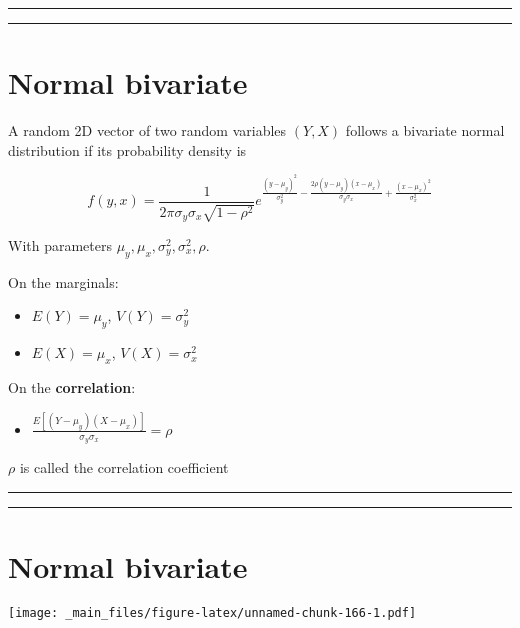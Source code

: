 \documentclass[
]{book}
\providecommand{\tightlist}{%
  \setlength{\itemsep}{0pt}\setlength{\parskip}{0pt}}
\begin{document}
\begin{center}\rule{0.5\linewidth}{0.5pt}\end{center}

\begin{center}\rule{0.5\linewidth}{0.5pt}\end{center}

\hypertarget{normal-bivariate}{%
\section{Normal bivariate}\label{normal-bivariate}}

A random 2D vector of two random variables \((Y, X)\) follows a bivariate normal distribution if its probability density is

\[f(y,x)=\frac{1}{2\pi \sigma_y\sigma_x \sqrt{1-\rho^2}}e^{\frac{(y-\mu_y)^2}{\sigma_y^2}-\frac{2\rho(y-\mu_y)(x-\mu_x)}{\sigma_y\sigma_x}+\frac{(x-\mu_x)^2}{\sigma_x^2}}\]

With parameters \(\mu_y, \mu_x, \sigma^2_y, \sigma_x^2, \rho\).

On the marginals:

\begin{itemize}
\tightlist
\item
  \(E(Y)=\mu_y\), \(V(Y)=\sigma^2_y\)
\item
  \(E(X)=\mu_x\), \(V(X)=\sigma^2_x\)
\end{itemize}

On the \textbf{correlation}:

\begin{itemize}
\tightlist
\item
  \(\frac{E[(Y-\mu_y)(X-\mu_x)]}{\sigma_y\sigma_x}=\rho\)
\end{itemize}

\(\rho\) is called the correlation coefficient

\begin{center}\rule{0.5\linewidth}{0.5pt}\end{center}

\begin{center}\rule{0.5\linewidth}{0.5pt}\end{center}

\hypertarget{normal-bivariate-1}{%
\section{Normal bivariate}\label{normal-bivariate-1}}

\texttt{[image: \_main\_files/figure-latex/unnamed-chunk-166-1.pdf]}
\end{document}
